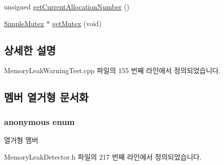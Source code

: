 \begin{DoxyCompactItemize}
\item 
unsigned \hyperlink{class_memory_leak_detector_a774a54e55a1203f145f722609ae18317}{get\+Current\+Allocation\+Number} ()
\item 
\hyperlink{class_simple_mutex}{Simple\+Mutex} $\ast$ \hyperlink{class_memory_leak_detector_a19d27cb7dd06173cc88f58543bfe3020}{get\+Mutex} (void)
\end{DoxyCompactItemize}


\subsection{상세한 설명}


Memory\+Leak\+Warning\+Test.\+cpp 파일의 155 번째 라인에서 정의되었습니다.



\subsection{멤버 열거형 문서화}
\subsubsection[{\texorpdfstring{anonymous enum}{anonymous enum}}]{\setlength{\rightskip}{0pt plus 5cm}anonymous enum\hspace{0.3cm}{\ttfamily [inherited]}}\hypertarget{class_memory_leak_detector_a81929fb3d21206b62f55bcb744f71d5d}{}\label{class_memory_leak_detector_a81929fb3d21206b62f55bcb744f71d5d}
\begin{Desc}
\item[열거형 멤버]\par
\begin{description}
\item[{\em 
memory\+\_\+corruption\+\_\+buffer\+\_\+size\hypertarget{class_memory_leak_detector_a81929fb3d21206b62f55bcb744f71d5da5220cc4ba0bebf171c9984d05561bcc2}{}\label{class_memory_leak_detector_a81929fb3d21206b62f55bcb744f71d5da5220cc4ba0bebf171c9984d05561bcc2}
}]\end{description}
\end{Desc}


Memory\+Leak\+Detector.\+h 파일의 217 번째 라인에서 정의되었습니다.


